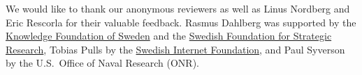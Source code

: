 We would like to thank our anonymous reviewers as well as Linus Nordberg and
Eric Rescorla for their valuable feedback.
Rasmus Dahlberg was supported by the \href{www.kks.se}{Knowledge Foundation of
Sweden} and the \href{https://strategiska.se/en/}{Swedish Foundation for
Strategic Research},
Tobias Pulls by the \href{https://internetstiftelsen.se/en/}{Swedish Internet
Foundation}, and
Paul Syverson by the U.S.\ Office of Naval Research (ONR).
